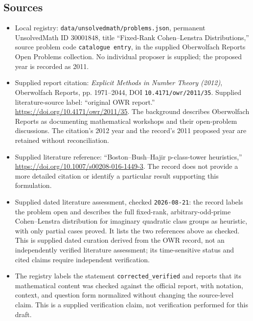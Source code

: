 \documentclass[11pt]{article}
\begin{document}
\subsection{Sources}
\begin{itemize}
\item Local registry: \texttt{data/unsolvedmath/problems.json}, permanent UnsolvedMath ID \(30001848\), title ``Fixed-Rank Cohen--Lenstra Distributions,'' source problem code \texttt{catalogue entry}, in the supplied Oberwolfach Reports Open Problems collection. No individual proposer is supplied; the proposed year is recorded as 2011.
\item Supplied report citation: \emph{Explicit Methods in Number Theory (2012)}, Oberwolfach Reports, pp. 1971--2044, DOI \texttt{10.4171/owr/2011/35}. Supplied literature-source label: ``original OWR report.'' \url{https://doi.org/10.4171/owr/2011/35}. The background describes Oberwolfach Reports as documenting mathematical workshops and their open-problem discussions. The citation's 2012 year and the record's 2011 proposed year are retained without reconciliation.
\item Supplied literature reference: ``Boston--Bush--Hajir p-class-tower heuristics,'' \url{https://doi.org/10.1007/s00208-016-1449-3}. The record does not provide a more detailed citation or identify a particular result supporting this formulation.
\item Supplied dated literature assessment, checked \texttt{2026-08-21}: the record labels the problem open and describes the full fixed-rank, arbitrary-odd-prime Cohen--Lenstra distribution for imaginary quadratic class groups as heuristic, with only partial cases proved. It lists the two references above as checked. This is supplied dated curation derived from the OWR record, not an independently verified literature assessment; its time-sensitive status and cited claims require independent verification.
\item The registry labels the statement \texttt{corrected\_verified} and reports that its mathematical content was checked against the official report, with notation, context, and question form normalized without changing the source-level claim. This is a supplied verification claim, not verification performed for this draft.
\end{itemize}
\end{document}
